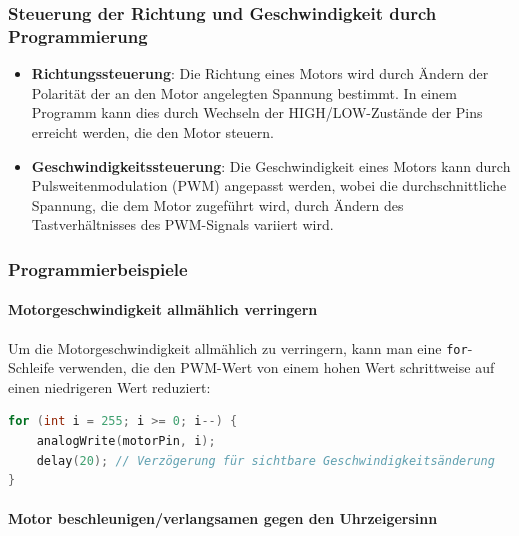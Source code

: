 \documentclass{vorlage-design-main}
\begin{document}
\hypertarget{steuerung-der-richtung-und-geschwindigkeit-durch-programmierung}{%
\subsubsection{Steuerung der Richtung und Geschwindigkeit durch
Programmierung}\label{steuerung-der-richtung-und-geschwindigkeit-durch-programmierung}}

\begin{itemize}

\item
  \textbf{Richtungssteuerung}: Die Richtung eines Motors wird durch
  Ändern der Polarität der an den Motor angelegten Spannung bestimmt. In
  einem Programm kann dies durch Wechseln der HIGH/LOW-Zustände der Pins
  erreicht werden, die den Motor steuern.
\item
  \textbf{Geschwindigkeitssteuerung}: Die Geschwindigkeit eines Motors
  kann durch Pulsweitenmodulation (PWM) angepasst werden, wobei die
  durchschnittliche Spannung, die dem Motor zugeführt wird, durch Ändern
  des Tastverhältnisses des PWM-Signals variiert wird.
\end{itemize}

\hypertarget{programmierbeispiele}{%
\subsubsection{Programmierbeispiele}\label{programmierbeispiele}}

\hypertarget{motorgeschwindigkeit-allmuxe4hlich-verringern}{%
\paragraph{Motorgeschwindigkeit allmählich
verringern}\label{motorgeschwindigkeit-allmaehlich-verringern}}

Um die Motorgeschwindigkeit allmählich zu verringern, kann man eine
\verb|for|-Schleife verwenden, die den PWM-Wert von
einem hohen Wert schrittweise auf einen niedrigeren Wert reduziert:

\begin{lstlisting}[language={C++}]
for (int i = 255; i >= 0; i--) {
    analogWrite(motorPin, i);
    delay(20); // Verzögerung für sichtbare Geschwindigkeitsänderung
}
\end{lstlisting}

\hypertarget{motor-beschleunigenverlangsamen-gegen-den-uhrzeigersinn}{%
\paragraph{Motor beschleunigen/verlangsamen gegen den
Uhrzeigersinn}\label{motor-beschleunigenverlangsamen-gegen-den-uhrzeigersinn}}
\end{document}
